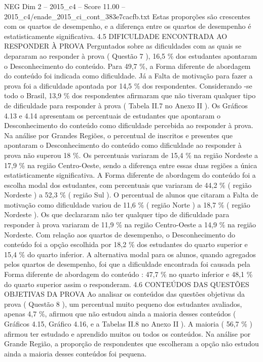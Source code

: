 \begin{textsample}{NEG Dim 2 – 2015\_c4 – Score 11.00 – 2015\_c4/enade\_2015\_ci\_cont\_383e7cacfb.txt}
Estas proporções são crescentes com os quartos de desempenho, e a diferença entre os quartos de desempenho é estatisticamente significativa. 4.5 DIFICULDADE ENCONTRADA AO RESPONDER À PROVA Perguntados sobre as dificuldades com as quais se depararam ao responder à prova ( Questão 7 ), 16,5 \% dos estudantes apontaram o Desconhecimento do conteúdo.
Para 49,7 \%, a Forma diferente de abordagem do conteúdo foi indicada como dificuldade.
Já a Falta de motivação para fazer a prova foi a dificuldade apontada por 14,5 \% dos respondentes.
Considerando -se todo o Brasil, 13,9 \% dos respondentes afirmaram que não tiveram qualquer tipo de dificuldade para responder à prova ( Tabela II.7 no Anexo II ).
Os Gráficos 4.13 e 4.14 apresentam os percentuais de estudantes que apontaram o Desconhecimento do conteúdo como dificuldade percebida ao responder à prova.
Na análise por Grandes Regiões, o percentual de inscritos e presentes que apontaram o Desconhecimento do conteúdo como dificuldade ao responder à prova não superou 18 \%.
Os percentuais variaram de 15,4 \% na região Nordeste a 17,9 \% na região Centro-Oeste, sendo a diferença entre essas duas regiões a única estatisticamente significativa.
A Forma diferente de abordagem do conteúdo foi a escolha modal dos estudantes, com percentuais que variaram de 44,2 \% ( região Nordeste ) a 52,3 \% ( região Sul ).
O percentual de alunos que citaram a Falta de motivação como dificuldade variou de 11,6 \% ( região Norte ) a 18,7 \% ( região Nordeste ).
Os que declararam não ter qualquer tipo de dificuldade para responder à prova variaram de 11,9 \% na região Centro-Oeste a 14,9 \% na região Nordeste.
Com relação aos quartos de desempenho, o Desconhecimento do conteúdo foi a opção escolhida por 18,2 \% dos estudantes do quarto superior e 15,4 \% do quarto inferior.
A alternativa modal para os alunos, quando agregados pelos quartos de desempenho, foi que a dificuldade encontrada foi causada pela Forma diferente de abordagem do conteúdo : 47,7 \% no quarto inferior e 48,1 \% do quarto superior assim o responderam. 4.6 CONTEÚDOS DAS QUESTÕES OBJETIVAS DA PROVA Ao analisar os conteúdos das questões objetivas da prova ( Questão 8 ), um percentual muito pequeno dos estudantes avaliados, apenas 4,7 \%, afirmou que não estudou ainda a maioria desses conteúdos ( Gráficos 4.15, Gráfico 4.16, e a Tabelas II.8 no Anexo II ).
A maioria ( 56,7 \% ) afirmou ter estudado e aprendido muitos ou todos os conteúdos.
Na análise por Grande Região, a proporção de respondentes que escolheram a opção não estudou ainda a maioria desses conteúdos foi pequena.

\end{textsample}
